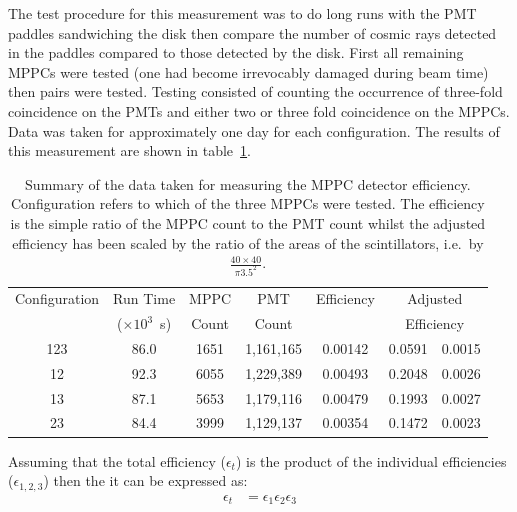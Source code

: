 The test procedure for this measurement was to do long runs with the PMT paddles sandwiching the disk then compare the number of cosmic rays detected in the paddles compared to those detected by the disk. First all remaining MPPCs were tested (one had become irrevocably damaged during beam time) then pairs were tested. Testing consisted of counting the occurrence of three-fold coincidence on the PMTs and either two or three fold coincidence on the MPPCs. Data was taken for approximately one day for each configuration. The results of this measurement are shown in table~\ref{tab:music2_eff}.

\begin{table}
  \begin{center}
    \begin{tabular}{c | c | c | c | c | r@{~\( \pm \)~}l}
      Configuration  &  Run Time             &  MPPC   &  PMT        &  Efficiency  &  \multicolumn{2}{c}{Adjusted}   \\
                     &  (\(\times 10^3\)~s)  &  Count  &  Count      &              &  \multicolumn{2}{c}{Efficiency} \\
      \hline
      123            &  86.0                 &  1651   &  1,161,165  &  0.00142     &  0.0591 & 0.0015  \\
      12             &  92.3                 &  6055   &  1,229,389  &  0.00493     &  0.2048 & 0.0026  \\
      13             &  87.1                 &  5653   &  1,179,116  &  0.00479     &  0.1993 & 0.0027  \\
      23             &  84.4                 &  3999   &  1,129,137  &  0.00354     &  0.1472 & 0.0023  \\
        
    \end{tabular}
  \end{center}
  \caption{Summary of the data taken for measuring the MPPC detector efficiency. Configuration refers to which of the three MPPCs were tested. The efficiency is the simple ratio of the MPPC count to the PMT count whilst the adjusted efficiency has been scaled by the ratio of the areas of the scintillators, i.e.\ by \( \frac{40\times40}{\pi3.5^2} \).}
  \label{tab:music2_eff}
\end{table}

Assuming that the total efficiency (\( \epsilon_t \)) is the product of the individual efficiencies (\( \epsilon_{1,2,3} \)) then the it can be expressed as:
\begin{align}
  \epsilon_t &= \epsilon_1  \epsilon_2  \epsilon_3
\end{align}

